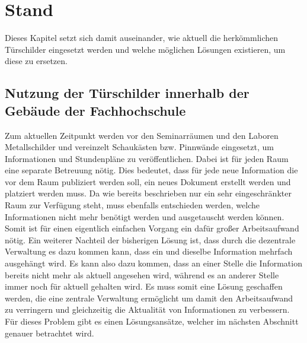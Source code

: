 \chapter{ Stand }\label{chap:Stand}
\vspace{-3cm}
\begin{flushleft}
Dieses Kapitel setzt sich damit auseinander, wie aktuell die herkömmlichen Türschilder eingesetzt werden und welche möglichen Lösungen existieren, um diese zu ersetzen.

\section{Nutzung der Türschilder innerhalb der Gebäude der Fachhochschule} 
Zum aktuellen Zeitpunkt werden vor den Seminarräumen und den Laboren Metallschilder und vereinzelt Schaukästen bzw. Pinnwände eingesetzt, um Informationen und Stundenpläne zu veröffentlichen. Dabei ist für jeden Raum eine separate Betreuung nötig. Dies bedeutet, dass für jede neue Information die vor dem Raum publiziert werden soll, ein neues Dokument erstellt werden und platziert werden muss. Da wie bereits beschrieben nur ein sehr eingeschränkter Raum zur Verfügung steht, muss ebenfalls entschieden werden, welche Informationen nicht mehr benötigt werden und ausgetauscht werden können. Somit ist für einen eigentlich einfachen Vorgang ein dafür großer Arbeitsaufwand nötig. Ein weiterer Nachteil der bisherigen Lösung ist, dass durch die dezentrale Verwaltung es dazu kommen kann, dass ein und dieselbe Information mehrfach ausgehängt wird. Es kann also dazu kommen, dass an einer Stelle die Information bereits nicht mehr als aktuell angesehen wird, während es an anderer Stelle immer noch für aktuell gehalten wird. Es muss somit eine Lösung geschaffen werden, die eine zentrale Verwaltung ermöglicht um damit den Arbeitsaufwand zu verringern und gleichzeitig die Aktualität von Informationen zu verbessern. 
Für dieses Problem gibt es einen Lösungsansätze, welcher im nächsten Abschnitt genauer betrachtet wird. 


\end{flushleft}
